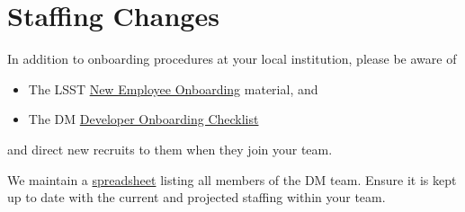 \section{Staffing Changes}\label{staffing-changes}

In addition to onboarding procedures at your local institution, please
be aware of

\begin{itemize}
\item
  The LSST \href{https://project.lsst.org/onboarding}{New Employee
  Onboarding} material, and
\item
  The DM
  \href{https://developer.lsst.io/getting-started/onboarding.html}{Developer
  Onboarding Checklist}
\end{itemize}

and direct new recruits to them when they join your team.

We maintain a
\href{https://docs.google.com/spreadsheets/d/1G9KXBJJHfWkVDQeApfXaN_nZjD_YUJlHiEDOzhTy-0c/edit?usp=drive_web}{spreadsheet}
listing all members of the DM team. Ensure it is kept up to date with
the current and projected staffing within your team.
